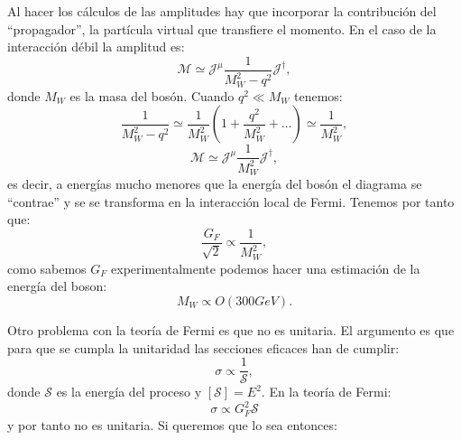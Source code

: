 \documentclass{article}
\theoremstyle{plain}
\theoremstyle{definition}
\begin{document}
	\noindent
	\begin{minipage}[t]{.5\textwidth}
		\centering
	\end{minipage}%
	\begin{minipage}[t]{.5\textwidth}
		\centering
	\end{minipage}
Al hacer los cálculos de las amplitudes hay que incorporar la contribución del ``propagador'', la partícula virtual que transfiere el momento. En el caso de la interacción débil la amplitud es:
\[
\mathcal{M} \simeq \mathcal{J}^\mu\frac{1}{M_W^2-q^2}\mathcal{J}^\dagger,
\]
donde \(M_W\) es la masa del bosón. Cuando \(q^2\ll M_W\) tenemos:
\[
\frac{1}{M_W^2-q^2} \simeq \frac{1}{M_W^2}\left(1+\frac{q^2}{M_W^2}+\dots\right)\simeq\frac{1}{M_W^2},
	\]
	\[
	\mathcal{M} \simeq \mathcal{J}^\mu\frac{1}{M_W^2}\mathcal{J}^\dagger,
	\]
	es decir, a energías mucho menores que la energía del bosón el diagrama se ``contrae'' y se se transforma en la interacción local de Fermi. Tenemos por tanto que: \[
	\frac{G_F}{\sqrt{2}} \propto \frac{1}{M_W^2},
	\]
	como sabemos \(G_F\) experimentalmente podemos hacer una estimación de la energía del boson:\[
	M_W \propto O(300GeV)\text{.}
	\]\par
	Otro problema con la teoría de Fermi es que no es unitaria. El argumento es que para que se cumpla la unitaridad las secciones eficaces han de cumplir:\[
	\sigma\propto\frac{1}{\mathcal{S}},
	\]
	donde \(\mathcal{S}\) es la energía del proceso y \(\left[\mathcal{S}\right] = E^2 \). En la teoría de Fermi:
	\[
	\sigma \propto G_F^2\mathcal{S}
	\]  y por tanto no es unitaria. Si queremos que lo sea entonces:
\end{document}
